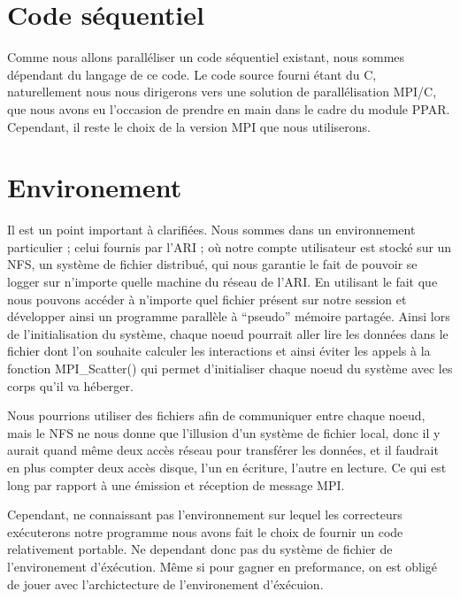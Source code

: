 \section{Code séquentiel}

\par Comme nous allons paralléliser un code séquentiel existant,
nous sommes dépendant du langage de ce code. Le code source fourni 
étant du C, naturellement nous nous dirigerons vers une solution 
de parallélisation MPI/C, que nous avons eu l'occasion de prendre 
en main dans le cadre du module PPAR. Cependant, il reste le choix de la 
version MPI que nous utiliserons.\\

\section{Environement}

\par Il est un point important à clarifiées. Nous sommes dans un environnement particulier ; 
celui fournis par l'ARI ; où notre compte utilisateur est stocké sur un NFS, un système de fichier 
distribué, qui nous garantie le fait de pouvoir se logger sur n'importe quelle machine du réseau 
de l'ARI. En utilisant le fait que nous pouvons accéder à n'importe quel fichier présent sur 
notre session et développer ainsi un programme parallèle à ``pseudo'' mémoire partagée.
Ainsi lors de l'initialisation du système, chaque noeud  pourrait aller lire les données dans le fichier
 dont l'on souhaite calculer les interactions et ainsi éviter les appels à la fonction 
MPI\_Scatter() qui permet d'initialiser chaque noeud du système avec les corps qu'il va héberger.\\

\par Nous pourrions utiliser des fichiers afin de communiquer entre chaque noeud, mais le NFS ne nous
donne que l'illusion d'un système de fichier local, donc il y aurait quand même deux accès réseau pour 
transférer les données, et il faudrait en plus compter deux accès disque, l'un en écriture, l'autre en lecture.
Ce qui est long par rapport à une émission et réception de message MPI.\\

\par Cependant, ne connaissant pas l'environnement sur lequel les correcteurs exécuterons notre 
programme nous avons fait le choix de fournir un code relativement portable. Ne dependant donc pas du système
de fichier de l'environement d'éxécution.
Même si pour gagner en preformance, on est obligé de jouer avec l'archictecture de l'environement d'éxécuion.\\


